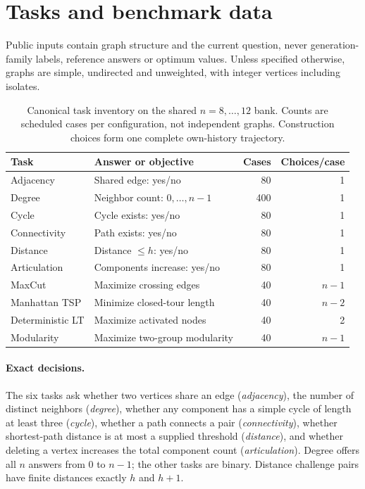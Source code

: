 \section{Tasks and benchmark data}
\label{sec:tasks}
Public inputs contain graph structure and the current question, never
generation-family labels, reference answers or optimum values.
Unless specified otherwise, graphs are simple, undirected and unweighted,
with integer vertices including isolates.

\begin{table}[ht]
\centering\small
\begin{tabular}{llrr}
\toprule
Task & Answer or objective & Cases & Choices/case\\
\midrule
Adjacency & Shared edge: yes/no & 80 & 1\\
Degree & Neighbor count: $0,\ldots,n-1$ & 400 & 1\\
Cycle & Cycle exists: yes/no & 80 & 1\\
Connectivity & Path exists: yes/no & 80 & 1\\
Distance & Distance $\leq h$: yes/no & 80 & 1\\
Articulation & Components increase: yes/no & 80 & 1\\
\midrule
MaxCut & Maximize crossing edges & 40 & $n-1$\\
Manhattan TSP & Minimize closed-tour length & 40 & $n-2$\\
Deterministic LT & Maximize activated nodes & 40 & 2\\
Modularity & Maximize two-group modularity & 40 & $n-1$\\
\bottomrule
\end{tabular}
\caption{Canonical task inventory on the shared $n=8,\ldots,12$ bank.
Counts are scheduled cases per configuration, not independent graphs.
Construction choices form one complete own-history trajectory.}
\label{tab:task-overview}
\end{table}

\paragraph{Exact decisions.}
The six tasks ask whether two vertices share an edge (\emph{adjacency}),
the number of distinct neighbors (\emph{degree}), whether any component has
a simple cycle of length at least three (\emph{cycle}), whether a path
connects a pair (\emph{connectivity}), whether shortest-path distance is at
most a supplied threshold (\emph{distance}), and whether deleting a vertex
increases the total component count (\emph{articulation}). Degree offers
all $n$ answers from 0 to $n-1$; the other tasks are binary. Distance
challenge pairs have finite distances exactly $h$ and $h+1$.

